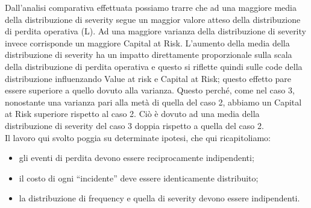 \documentclass[titlepage]{article}
\begin{document}
\begin{itemize}
Dall’analisi comparativa effettuata possiamo trarre che ad una maggiore media della distribuzione di severity segue un maggior valore atteso della distribuzione di perdita operativa (L). Ad una maggiore varianza della distribuzione di severity invece corrisponde un maggiore Capital at Risk. L’aumento della media della distribuzione di severity ha un impatto direttamente proporzionale sulla scala della distribuzione di perdita operativa e questo si riflette quindi sulle code della distribuzione influenzando Value at risk e Capital at Risk; questo effetto pare essere superiore a quello dovuto alla varianza. Questo perché, come nel caso 3, nonostante una varianza pari alla metà di quella del caso 2, abbiamo un Capital at Risk superiore rispetto al caso 2. Ciò è dovuto ad una media della distribuzione di severity del caso 3 doppia rispetto a quella del caso 2.
\\
Il lavoro qui svolto poggia su determinate ipotesi, che qui ricapitoliamo:
\begin{itemize}

\item 	gli eventi di perdita devono essere reciprocamente indipendenti;
\item 	il costo di ogni “incidente” deve essere identicamente distribuito;
\item 	la distribuzione di frequency e quella di severity devono essere indipendenti.
	

\end{itemize}
\end{itemize}
\end{document}
